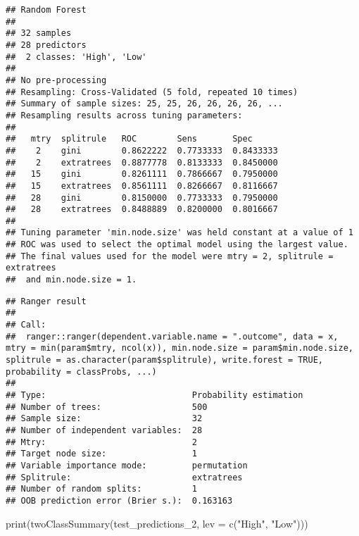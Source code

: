 \documentclass[
  oneside]{book}
\newenvironment{Shaded}{\begin{snugshade}}{\end{snugshade}}
\newcommand{\AttributeTok}[1]{\textcolor[rgb]{0.77,0.63,0.00}{#1}}
\newcommand{\FunctionTok}[1]{\textcolor[rgb]{0.00,0.00,0.00}{#1}}
\newcommand{\NormalTok}[1]{#1}
\newcommand{\SpecialCharTok}[1]{\textcolor[rgb]{0.00,0.00,0.00}{#1}}
\newcommand{\StringTok}[1]{\textcolor[rgb]{0.31,0.60,0.02}{#1}}
\begin{document}
\begin{verbatim}
## Random Forest 
## 
## 32 samples
## 28 predictors
##  2 classes: 'High', 'Low' 
## 
## No pre-processing
## Resampling: Cross-Validated (5 fold, repeated 10 times) 
## Summary of sample sizes: 25, 25, 26, 26, 26, 26, ... 
## Resampling results across tuning parameters:
## 
##   mtry  splitrule   ROC        Sens       Spec     
##    2    gini        0.8622222  0.7733333  0.8433333
##    2    extratrees  0.8877778  0.8133333  0.8450000
##   15    gini        0.8261111  0.7866667  0.7950000
##   15    extratrees  0.8561111  0.8266667  0.8116667
##   28    gini        0.8150000  0.7733333  0.7950000
##   28    extratrees  0.8488889  0.8200000  0.8016667
## 
## Tuning parameter 'min.node.size' was held constant at a value of 1
## ROC was used to select the optimal model using the largest value.
## The final values used for the model were mtry = 2, splitrule = extratrees
##  and min.node.size = 1.
\end{verbatim}

\begin{Shaded}
\end{Shaded}

\begin{verbatim}
## Ranger result
## 
## Call:
##  ranger::ranger(dependent.variable.name = ".outcome", data = x,      mtry = min(param$mtry, ncol(x)), min.node.size = param$min.node.size,      splitrule = as.character(param$splitrule), write.forest = TRUE,      probability = classProbs, ...) 
## 
## Type:                             Probability estimation 
## Number of trees:                  500 
## Sample size:                      32 
## Number of independent variables:  28 
## Mtry:                             2 
## Target node size:                 1 
## Variable importance mode:         permutation 
## Splitrule:                        extratrees 
## Number of random splits:          1 
## OOB prediction error (Brier s.):  0.163163
\end{verbatim}

\begin{Shaded}
\begin{Highlighting}[]
\FunctionTok{print}\NormalTok{(}\FunctionTok{twoClassSummary}\NormalTok{(test\_predictions\_2, }\AttributeTok{lev =} \FunctionTok{c}\NormalTok{(}\StringTok{"High"}\NormalTok{, }\StringTok{"Low"}\NormalTok{)))}
\end{Highlighting}
\end{Shaded}
\end{document}
